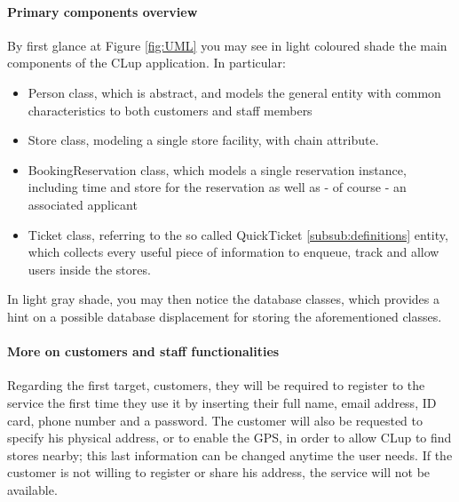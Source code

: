 \paragraph{Primary components overview}
By first glance at Figure \ref{fig:UML} you may see in light coloured shade the main components of the CLup application. In particular:\newline
\begin{itemize}
    \item Person class, which is abstract, and models the general entity with common characteristics to both customers and staff members
    \item Store class, modeling a single store facility, with chain attribute.
    \item BookingReservation class, which models a single reservation instance, including time and store for the reservation as well as - of course - an associated applicant
    \item Ticket class, referring to the so called QuickTicket \ref{subsub:definitions} entity, which collects every useful piece of information to enqueue, track and allow users inside the stores.
\end{itemize}
In light gray shade, you may then notice the database classes,  which provides a hint on a possible database displacement for storing the aforementioned classes.


\paragraph{More on customers and staff functionalities}
Regarding the first target, customers, they will be required to register to the service the first time they use it by inserting their full name, email address, ID card, phone number and a password. The customer will also be requested to specify his physical address, or to enable the GPS, in order to allow CLup to find stores nearby; this last information can be changed anytime the user needs. If the customer is not willing to register or share his address, the service will not be available.

